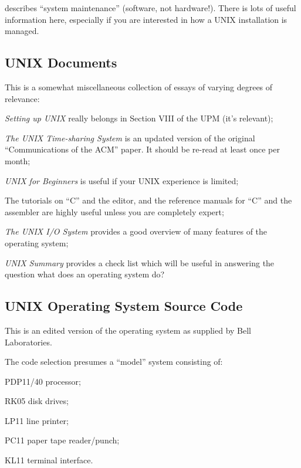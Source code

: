 \item[Section VIII] describes ``system
maintenance'' (software, not
hardware!). There is lots of useful
information here, especially
if you are interested in how a
UNIX installation is managed.
\ed

\subsection{UNIX Documents}

This is a somewhat miscellaneous collection
of essays of varying degrees of
relevance:

\bi
\item {\it Setting up UNIX} really belongs in
Section VIII of the UPM (it's
relevant);

\item {\it The UNIX Time-sharing System} is an
updated version of the original
``Communications of the ACM'' paper.
It should be re-read at least once
per month;

\item {\it UNIX for Beginners} is useful if
your UNIX experience is limited;

\item The tutorials on ``C'' and the editor,
and the reference manuals for
``C'' and the assembler are highly
useful unless you are completely
expert;

\item {\it The UNIX I/O System} provides a
good overview of many features of
the operating system;

\item {\it UNIX Summary} provides a check list
which will be useful in answering
the question what does an operating system do?
\ei

\subsection{UNIX Operating System Source Code}

This is an edited version of the
operating system as supplied by Bell
Laboratories.

The code selection presumes a ``model''
system consisting of:

\bi
\item PDP11/40 processor;
\item RK05 disk drives;
\item LP11 line printer;
\item PC11 paper tape reader/punch;
\item KL11 terminal interface.
\ei

